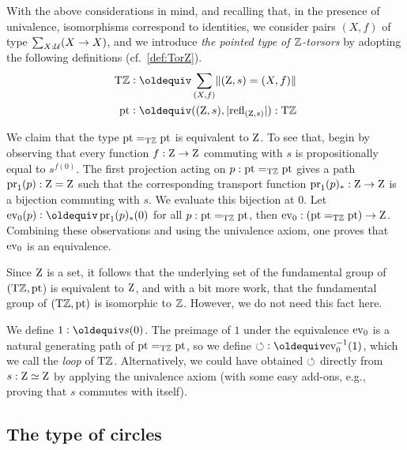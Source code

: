 \documentclass[a4paper,12pt]{amsart}
\begin{document}
With the above considerations in mind, and recalling that, in the presence of univalence, isomorphisms correspond to identities,
we consider pairs $(X,f)$ of type $\sum_{X:\mathcal{U}}(X\to X)$,
and we introduce \emph{the pointed type of $\mathbb{Z}$-torsors} by adopting the following definitions
(cf.~\cref{def:TorZ}).
\begin{align*}
  \TorZ &\defeq \sum_{(X,f)}\Trunc{(\zet,s)=(X,f)}  \\
  \pt & \defeq ((\zet,s),\trunc{\refl{(\zet,s)}}) : \TorZ
\end{align*}

{We claim}
that the type ${\mathord{\mathrm{pt}}} =_{\mathrm{T}\mathbb{Z}} {\mathord{\mathrm{pt}}}$ is equivalent to $\mathrm{Z}$.
To see that,
begin by observing that every function $f:\mathrm{Z}\to\mathrm{Z}$ commuting with $s$
is propositionally equal to $s^{f(0)}$.  The first projection
acting on $p : {\mathord{\mathrm{pt}}} =_{\mathrm{T}\mathbb{Z}} {\mathord{\mathrm{pt}}}$ gives a path $\operatorname{pr}_1(p) : \mathrm{Z}=\mathrm{Z}$
such that the corresponding transport function $\operatorname{pr}_1(p)_* : \mathrm{Z}\to\mathrm{Z}$
is a bijection commuting with $s$. We evaluate this bijection {at} $0$.
Let $\ev_0(p) \defeq \pr_1(p)_*(0)$ for all $p : {\mathord{\mathrm{pt}}} =_{\mathrm{T}\mathbb{Z}} {\mathord{\mathrm{pt}}}$,
then $\mathrm{ev}_0 : ({\mathord{\mathrm{pt}}} =_{\mathrm{T}\mathbb{Z}} {\mathord{\mathrm{pt}}}) \to \mathrm{Z}$.  Combining these observations {and}
using the univalence axiom, one proves that $\mathrm{ev}_0$ is an equivalence.

Since $\mathrm{Z}$ is a set, it follows that the underlying set of the fundamental group of $({\mathrm{T}\mathbb{Z}},{\mathord{\mathrm{pt}}}$) is equivalent to $\mathrm{Z}$,
and with a bit more work, that the fundamental group of $({\mathrm{T}\mathbb{Z}},{\mathord{\mathrm{pt}}})$ is isomorphic to $\mathbb{Z}$.
However, we do not need this fact here.

We define $1 \defeq s(0)$.
The preimage of $1$ under the equivalence $\mathrm{ev}_0$ is a
natural generating path of ${\mathord{\mathrm{pt}}} =_{\mathrm{T}\mathbb{Z}} {\mathord{\mathrm{pt}}}$, so we define
${\Zloop}\defeq \ev_0^{-1}(1)$, which we call the \emph{loop}
of ${\mathrm{T}\mathbb{Z}}$. Alternatively, we could have obtained ${\circlearrowleft}$
directly from $s: \mathrm{Z}\simeq\mathrm{Z}$ by applying the univalence axiom
(with some easy add-ons, e.g., proving that $s$ commutes with itself).

\subsection{The type of circles}
\label{sec:circles}
\end{document}
